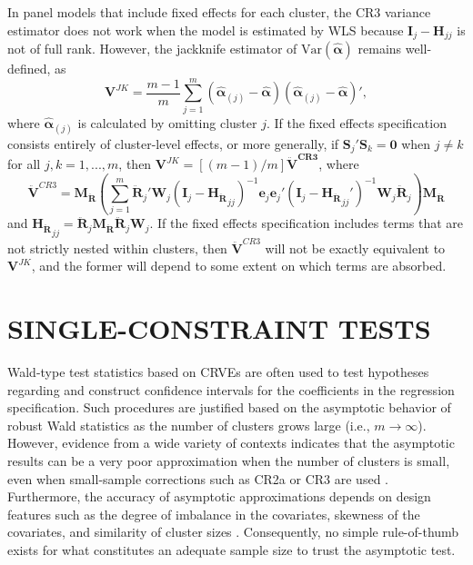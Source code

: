 \documentclass[12pt]{article}\usepackage[]{graphicx}\usepackage[]{color}
\newcommand{\Var}{\text{Var}}
\newcommand{\bm}{\mathbf}
\newcommand{\bs}{\boldsymbol}
\begin{document}
In panel models that include fixed effects for each cluster, the CR3 variance estimator does not work when the model is estimated by WLS because $\bm{I}_j - \bm{H}_{jj}$ is not of full rank. 
However, the jackknife estimator of $\Var\left(\bs{\hat\alpha}\right)$ remains well-defined, as 
\begin{equation}
\bm{V}^{JK} = \frac{m - 1}{m} \sum_{j=1}^m \left(\bs{\hat\alpha}_{(j)} - \bs{\hat\alpha}\right) \left(\bs{\hat\alpha}_{(j)} - \bs{\hat\alpha}\right)',
\end{equation}
where $\bs{\hat\alpha}_{(j)}$ is calculated by omitting cluster $j$. 
If the fixed effects specification consists entirely of cluster-level effects, or more generally, if $\bm{S}_j'\bm{S}_k = \bm{0}$ when $j \neq k$ for all $j,k=1,...,m$, then $\bm{V}^{JK} = [(m - 1) / m] \bm{\ddot{V}^{CR3}}$, where 
\begin{equation}
\label{eq:V_CR3_FE}
\bm{\ddot{V}}^{CR3} = \bm{M_{\ddot{R}}} \left(\sum_{j=1}^m \bm{\ddot{R}}_j' \bm{W}_j \left(\bm{I}_j - \bm{H_{\ddot{R}}}_{jj}\right)^{-1}\bm{e}_j \bm{e}_j' \left(\bm{I}_j - \bm{H_{\ddot{R}}}_{jj}'\right)^{-1}\bm{W}_j \bm{\ddot{R}}_j\right) \bm{M_{\ddot{R}}}
\end{equation}
and $\bm{H_{\ddot{R}}}_{jj} = \bm{\ddot{R}}_j \bm{M_{\ddot{R}}} \bm{\ddot{R}}_j\bm{W}_j$. 
If the fixed effects specification includes terms that are not strictly nested within clusters, then $\bm{\ddot{V}}^{CR3}$ will not be exactly equivalent to $\bm{V}^{JK}$, and the former will depend to some extent on which terms are absorbed.

\section{SINGLE-CONSTRAINT TESTS}
\label{sec:testing}

Wald-type test statistics based on CRVEs are often used to test hypotheses regarding and construct confidence intervals for the coefficients in the regression specification. 
Such procedures are justified based on the asymptotic behavior of robust Wald statistics as the number of clusters grows large (i.e., $m \to \infty$). 
However, evidence from a wide variety of contexts indicates that the asymptotic results can be a very poor approximation when the number of clusters is small, even when small-sample corrections such as CR2a or CR3 are used \citep{Bell2002bias, Bertrand2004how, Cameron2008bootstrap}. 
Furthermore, the accuracy of asymptotic approximations depends on design features such as the degree of imbalance in the covariates, skewness of the covariates, and similarity of cluster sizes \citep{McCaffrey2001generalizations, Tipton2015small, Webb2013wild}. 
Consequently, no simple rule-of-thumb exists for what constitutes an adequate sample size to trust the asymptotic test. 
\end{document}
